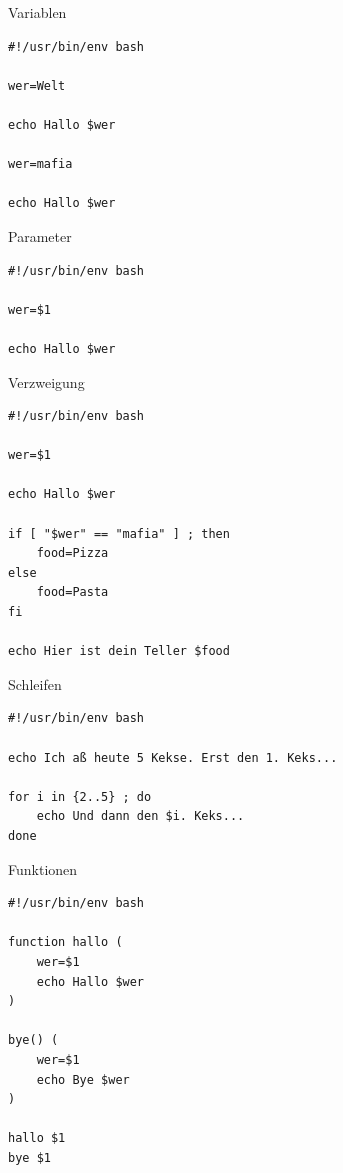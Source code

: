 \documentclass[compress]{beamer}
\begin{document}
\begin{frame}[fragile]{Variablen}
\begin{verbatim}
#!/usr/bin/env bash

wer=Welt

echo Hallo $wer

wer=mafia

echo Hallo $wer
\end{verbatim}
\end{frame}

\begin{frame}[fragile]{Parameter}
\begin{verbatim}
#!/usr/bin/env bash

wer=$1

echo Hallo $wer
\end{verbatim}
\end{frame}

\begin{frame}[fragile]{Verzweigung}
\begin{verbatim}
#!/usr/bin/env bash

wer=$1

echo Hallo $wer

if [ "$wer" == "mafia" ] ; then
    food=Pizza
else
    food=Pasta
fi

echo Hier ist dein Teller $food
\end{verbatim}
\end{frame}

\begin{frame}[fragile]{Schleifen}
\begin{verbatim}
#!/usr/bin/env bash

echo Ich aß heute 5 Kekse. Erst den 1. Keks...

for i in {2..5} ; do
    echo Und dann den $i. Keks...
done
\end{verbatim}
\end{frame}

\begin{frame}[fragile]{Funktionen}
\begin{verbatim}
#!/usr/bin/env bash

function hallo (
    wer=$1
    echo Hallo $wer
)

bye() (
    wer=$1
    echo Bye $wer
)

hallo $1
bye $1
\end{verbatim}
\end{frame}
\end{document}
